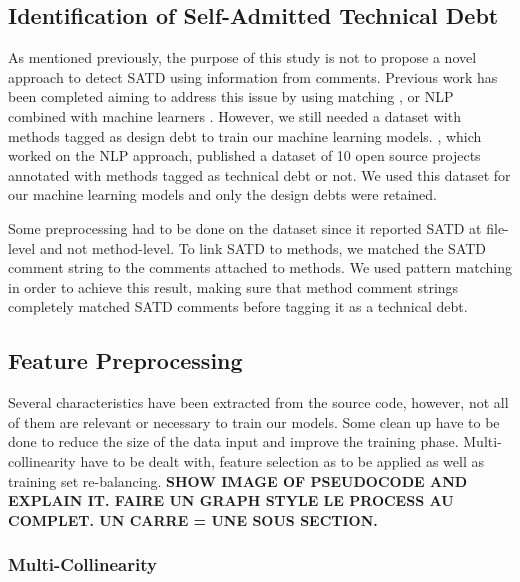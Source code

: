 \subsection{Identification of Self-Admitted Technical Debt}


As mentioned previously, the purpose of this study is not to propose a novel approach to detect \ac{SATD} using information from comments. Previous work has been completed aiming to address this issue by using  matching \citep{MaldonadoS15}, \citep{PotdarS14} or \ac{NLP} combined with machine learners \citep{maldonado17}. However, we still needed a dataset with methods tagged as design debt to train our machine learning models. \citet{maldonado17}, which worked on the \ac{NLP} approach, published a dataset of 10 open source projects annotated with methods tagged as technical debt or not. We used this dataset for our machine learning models and only the design debts were retained. \par

Some preprocessing had to be done on the dataset since it reported \ac{SATD} at file-level and not method-level. To link \ac{SATD} to methods, we matched the \ac{SATD} comment string to the comments attached to methods. We used pattern matching in order to achieve this result, making sure that method comment strings completely matched \ac{SATD} comments before tagging it as a technical debt.

\subsection{Feature Preprocessing}


Several characteristics have been extracted from the source code, however, not all of them are relevant or necessary to train our models. Some clean up have to be done to reduce the size of the data input and improve the training phase. Multi-collinearity have to be dealt with, feature selection as to be applied as well as training set re-balancing. \textbf{SHOW IMAGE OF PSEUDOCODE AND EXPLAIN IT. FAIRE UN GRAPH STYLE LE PROCESS AU COMPLET. UN CARRE = UNE SOUS SECTION.}

\subsubsection{Multi-Collinearity}

